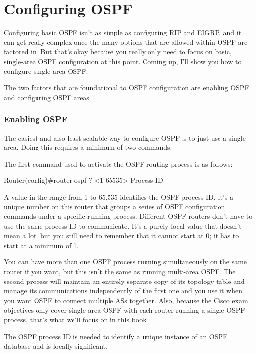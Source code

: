 \section{Configuring OSPF}

Configuring basic OSPF isn't as simple as configuring RIP and EIGRP, and
it can get really complex once the many options that are allowed within
OSPF are factored in. But that's okay because you really only need to
focus on basic, single-area OSPF configuration at this point. Coming up,
I'll show you how to configure single-area OSPF.

The two factors that are foundational to OSPF configuration are enabling
OSPF and configuring OSPF areas.

\subsubsection{Enabling OSPF}

The easiest and also least scalable way to configure OSPF is to just use
a single area. Doing this requires a minimum of two commands.

The first command used to activate the OSPF routing process is as
follows:

\begin{cli}
Router(config)#router ospf ?
<1-65535> Process ID
\end{cli}

A value in the range from 1 to 65,535 identifies the OSPF process ID.
It's a unique number on this router that groups a series of OSPF
configuration commands under a specific running process. Different OSPF
routers don't have to use the same process ID to communicate. It's a
purely local value that doesn't mean a lot, but you still need to
remember that it cannot start at 0; it has to start at a minimum of 1.

\protect\hypertarget{c18.xhtmlux5cux23Page_754}{}{}You can have more
than one OSPF process running simultaneously on the same router if you
want, but this isn't the same as running multi-area OSPF. The second
process will maintain an entirely separate copy of its topology table
and manage its communications independently of the first one and you use
it when you want OSPF to connect multiple ASs together. Also, because
the Cisco exam objectives only cover single-area OSPF with each router
running a single OSPF process, that's what we'll focus on in this book.


\begin{note}
The OSPF process ID is needed to identify a unique instance of an OSPF database and is locally significant.
\end{note}


